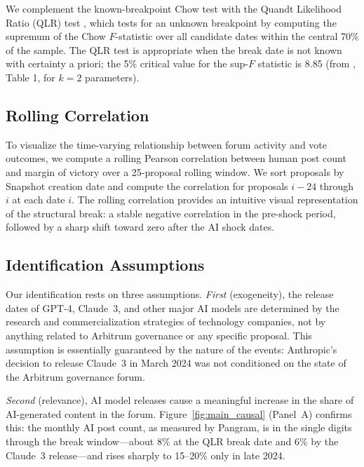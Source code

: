 \documentclass[12pt]{article}
\begin{document}
We complement the known-breakpoint Chow test with the Quandt Likelihood Ratio (QLR)
test \citep{quandt1960, andrews1993}, which tests for an unknown breakpoint by
computing the supremum of the Chow $F$-statistic over all candidate dates within
the central 70\% of the sample. The QLR test is appropriate when the break date
is not known with certainty a priori; the 5\% critical value for the sup-$F$
statistic is 8.85 (from \citealt{andrews1993}, Table 1, for $k = 2$ parameters).

\subsection{Rolling Correlation}

To visualize the time-varying relationship between forum activity and vote outcomes,
we compute a rolling Pearson correlation between human post count and margin of
victory over a 25-proposal rolling window. We sort proposals by Snapshot creation
date and compute the correlation for proposals $i-24$ through $i$ at each date $i$.
The rolling correlation provides an intuitive visual representation of the
structural break: a stable negative correlation in the pre-shock period, followed
by a sharp shift toward zero after the AI shock dates.

\subsection{Identification Assumptions}

Our identification rests on three assumptions. \emph{First} (exogeneity), the
release dates of GPT-4, Claude~3, and other major AI models are determined by the
research and commercialization strategies of technology companies, not by anything
related to Arbitrum governance or any specific proposal. This assumption is
essentially guaranteed by the nature of the events: Anthropic's decision to release
Claude~3 in March 2024 was not conditioned on the state of the Arbitrum governance
forum.

\emph{Second} (relevance), AI model releases cause a meaningful increase in the
share of AI-generated content in the forum. Figure~\ref{fig:main_causal} (Panel~A)
confirms this: the monthly AI post count, as measured by Pangram, is in the single digits through the break window---about 8\% at the QLR break date and 6\% by the Claude~3 release---and rises sharply to 15--20\% only in late 2024.
\end{document}
